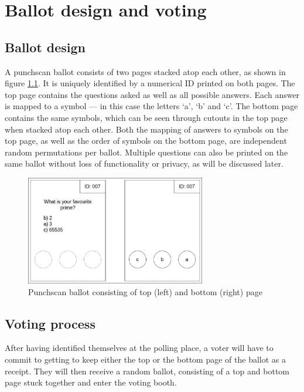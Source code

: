 \chapter{Ballot design and voting}
\label{ch:ballot_design_and_voting}

\section{Ballot design}

A punchscan ballot consists of two pages stacked atop each other, as shown in
figure \ref{fig:punchscan_ballot}. It is uniquely identified by a numerical ID
printed on both pages. The top page contains the questions asked as well as all
possible answers. Each answer is mapped to a symbol --- in this case the
letters `a', `b' and `c'. The bottom page contains the same symbols, which can
be seen through cutouts in the top page when stacked atop each other. Both the
mapping of answers to symbols on the top page, as well as the order of symbols
on the bottom page, are independent random permutations per ballot. Multiple
questions can also be printed on the same ballot without loss of functionality
or privacy, as will be discussed later.

\begin{figure}[h]
\centering
\includegraphics[width=0.7\textwidth]{../resources/high_level_ballot.drawio}
\caption{Punchscan ballot consisting of top (left) and bottom (right) page}
\label{fig:punchscan_ballot}
\end{figure}

\section{Voting process}

After having identified themselves at the polling place, a voter will have to
commit to getting to keep either the top or the bottom page of the ballot as a
receipt. They will then receive a random ballot, consisting of a top and bottom
page stuck together and enter the voting booth.

